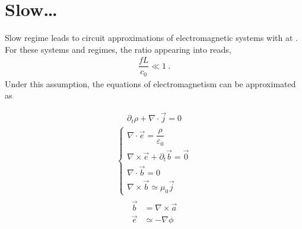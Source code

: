 \documentclass[letterpaper,10pt,english]{jupyterBook}
\begin{document}
\sphinxstepscope


\section{Slow…}
\label{\detokenize{ch/regimes-slow:slow}}\label{\detokenize{ch/regimes-slow:classical-electromagnetism-regimes}}\label{\detokenize{ch/regimes-slow::doc}}
\sphinxAtStartPar
Slow regime leads to circuit approximations of electromagnetic systems with  at . For these systems and regimes, the ratio appearing into {\hyperref[\detokenize{ch/regimes-non-dimensional:classical-electromagnetism-regimes-non-dimensional}]{}} reads,
\begin{equation*}
\begin{split}\dfrac{f L }{c_0} \ll 1 \ .\end{split}
\end{equation*}
\sphinxAtStartPar
Under this assumption, the equations of electromagnetism can be approximated as

\sphinxAtStartPar
{}
\begin{equation*}
\begin{split}\partial_t \rho + \nabla \cdot \vec{j} = 0\end{split}
\end{equation*}
\sphinxAtStartPar
{}
\begin{equation*}
\begin{split}\begin{cases}
    \nabla \cdot \vec{e} = \dfrac{\rho}{\varepsilon_0} \\
    \nabla \times \vec{e} + \partial_t \vec{b} = \vec{0} \\ 
    \nabla \cdot \vec{b} = 0 \\
    \nabla \times \vec{b} \simeq \mu_0 \vec{j} 
  \end{cases}\end{split}
\end{equation*}
\sphinxAtStartPar
{}
\begin{equation*}
\begin{split}\begin{aligned}
      \vec{b} & = \nabla \times \vec{a} \\
      \vec{e} & \simeq - \nabla \phi \\
   \end{aligned}\end{split}
\end{equation*}
\sphinxstepscope
\end{document}
